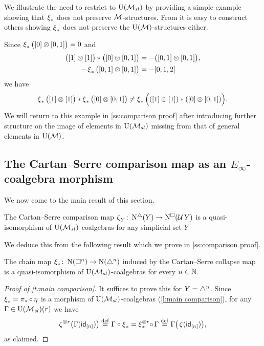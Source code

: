\begin{example}
	We illustrate the need to restrict to ${\operatorname{U}(\mathcal{M}_{sl})}$ by providing a simple example showing that $\operatorname{\xi}_\ast$ does not preserve $\mathcal{M}$-structures.
	From it is easy to construct others showing $\operatorname{\xi}_\ast$ does not preserve the ${\operatorname{U}(\mathcal{M})}$-structures either.

	Since $\operatorname{\xi}_\ast \big( [0] \otimes [0,1] \big) = 0$ and
	\begin{align*}
	\big( [1] \otimes [1] \big) \ast \big( [0] \otimes [0,1] \big) &=
	- \big( [0,1] \otimes [0,1] \big), \\
	- \operatorname{\xi}_\ast \big( [0,1] \otimes [0,1] \big) & = - [0,1,2]
	\end{align*}
	we have
	\[
	\operatorname{\xi}_\ast \big( [1] \otimes [1] \big) \ast \operatorname{\xi}_\ast \big( [0] \otimes [0,1] \big) \neq \operatorname{\xi}_\ast \Big( ([1] \otimes [1]) \ast ([0] \otimes [0,1]) \Big).
	\]
	We will return to this example in \cref{ss:comparison proof} after introducing further structure on the image of elements in ${\operatorname{U}(\mathcal{M}_{sl})}$ missing from that of general elements in ${\operatorname{U}(\mathcal{M})}$.
\end{example}

\subsection{The Cartan--Serre comparison map as an $E_\infty$-coalgebra morphism} \label{ss:the cartan-serre chain map}

We now come to the main result of this section.

\begin{theorem} \label{t:main comparison}
	The Cartan--Serre comparison map $\operatorname{\zeta}_Y \colon \operatorname{N^{\triangle}}(Y) \to \operatorname{N^{\square}}(\operatorname{\mathcal{U}} Y)$ is a quasi-isomorphism of ${\operatorname{U}(\mathcal{M}_{sl})}$-coalgebras for any simplicial set $Y$
\end{theorem}

We deduce this from the following result which we prove in \cref{ss:comparison proof}.

\begin{lemma} \label{l:main comparison}
	The chain map $\operatorname{\xi}_\ast \colon \operatorname{N}(\square^n) \to \operatorname{N}(\triangle^n)$ induced by the Cartan--Serre collapse map is a quasi-isomorphism of ${\operatorname{U}(\mathcal{M}_{sl})}$-coalgebras for every $n \in \mathbb{N}$.
\end{lemma}

\begin{proof}[Proof of \cref{t:main comparison}]
	It suffices to prove this for $Y = \triangle^n$.
	Since $\operatorname{\xi}_\ast = \operatorname{\pi}_\ast \circ \operatorname{\eta}$ is a morphism of ${\operatorname{U}(\mathcal{M}_{sl})}$-coalgebras (\cref{l:main comparison}), for any $\Gamma \in {\operatorname{U}(\mathcal{M}_{sl})}(r)$ we have
	\begin{align*}
	\operatorname{\zeta}^{\otimes r} \! \big( \Gamma(\mathsf{id}_{[n]}) \big) \stackrel{\mathrm{def}}{=}
	\Gamma \circ \operatorname{\xi}_\ast =
	\operatorname{\xi}_\ast^{\otimes r} \! \circ \, \Gamma \stackrel{\mathrm{def}}{=}
	\Gamma \big( \operatorname{\zeta} (\mathsf{id}_{[n]}) \big),
	\end{align*}
	as claimed.
\end{proof}

